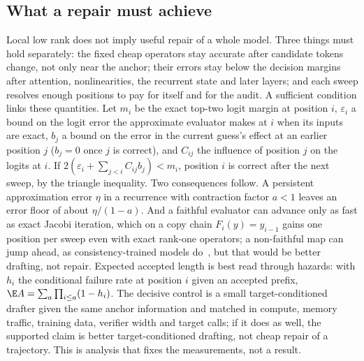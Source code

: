 \subsection{What a repair must achieve}\label{sec:repair-analysis}
Local low rank does not imply useful repair of a whole model. Three things must hold separately: the fixed cheap operators stay accurate after candidate tokens change, not only near the anchor; their errors stay below the decision margins after attention, nonlinearities, the recurrent state and later layers; and each sweep resolves enough positions to pay for itself and for the audit. A sufficient condition links these quantities. Let $m_i$ be the exact top-two logit margin at position $i$, $\varepsilon_i$ a bound on the logit error the approximate evaluator makes at $i$ when its inputs are exact, $b_j$ a bound on the error in the current guess's effect at an earlier position $j$ ($b_j=0$ once $j$ is correct), and $C_{ij}$ the influence of position $j$ on the logits at $i$. If $2(\varepsilon_i+\sum_{j<i}C_{ij}b_j)<m_i$, position $i$ is correct after the next sweep, by the triangle inequality. Two consequences follow. A persistent approximation error $\eta$ in a recurrence with contraction factor $a<1$ leaves an error floor of about $\eta/(1-a)$. And a faithful evaluator can advance only as fast as exact Jacobi iteration, which on a copy chain $F_i(y)=y_{i-1}$ gains one position per sweep even with exact rank-one operators; a non-faithful map can jump ahead, as consistency-trained models do~\cite{cllm}, but that would be better drafting, not repair. Expected accepted length is best read through hazards: with $h_i$ the conditional failure rate at position $i$ given an accepted prefix, $\E A=\sum_a\prod_{i\le a}(1-h_i)$. The decisive control is a small target-conditioned drafter given the same anchor information and matched in compute, memory traffic, training data, verifier width and target calls; if it does as well, the supported claim is better target-conditioned drafting, not cheap repair of a trajectory. This is analysis that fixes the measurements, not a result.


